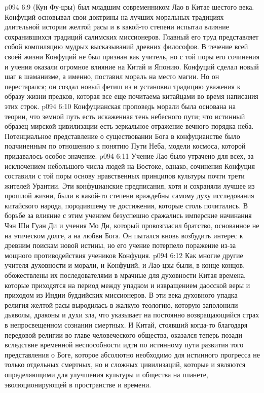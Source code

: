 \vs p094 6:9 \pc {} (Кун Фу\hyp{}цзы) был младшим современником Лао в Китае шестого века. Конфуций основывал свои доктрины на лучших моральных традициях длительной истории желтой расы и в какой\hyp{}то степени испытал влияние сохранившихся традиций салимских миссионеров. Главный его труд представляет собой компиляцию мудрых высказываний древних философов. В течение всей своей жизни Конфуций не был признан как учитель, но с той поры его сочинения и учения оказали огромное влияние на Китай и Японию. Конфуций сделал новый шаг в шаманизме, а именно, поставил мораль на место магии. Но он перестарался; он создал новый фетиш из  и установил традицию уважения к образу жизни предков, которая все еще почитаема китайцами во время написания этих строк.
\vs p094 6:10 Конфуцианская проповедь морали была основана на теории, что земной путь есть искаженная тень небесного пути; что истинный образец мирской цивилизации есть зеркальное отражение вечного порядка неба. Потенциальное представление о существовании Бога в конфуцианстве было подчиненным по отношению к понятию Пути Неба, модели космоса, которой придавалось особое значение.
\vs p094 6:11 Учение Лао было утрачено для всех, за исключением небольшого числа людей на Востоке, однако, сочинения Конфуция составили с той поры основу нравственных принципов культуры почти трети жителей Урантии. Эти конфуцианские предписания, хотя и сохраняли лучшее из прошлой жизни, были в какой\hyp{}то степени враждебны самому духу исследования китайского народа, породившему те достижения, которые столь почитались. В борьбе за влияние с этим учением безуспешно сражались имперские начинания Чэн Ши Гуан Ди и учения Мо Ди, который провозгласил братство, основанное не на этическом долге, а на любви Бога. Он пытался вновь возбудить интерес к древним поискам новой истины, но его учение потерпело поражение из\hyp{}за мощного противодействия учеников Конфуция.
\vs p094 6:12 Как многие другие учителя духовности и морали, и Конфуций, и Лао\hyp{}цзы были, в конце концов, обожествлены их последователями в мрачные для духовности Китая времена, которые приходятся на период между упадком и извращением даосской веры и приходом из Индии буддийских миссионеров. В эти века духовного упадка религия желтой расы выродилась в жалкую теологию, которую заполонили дьяволы, драконы и духи зла, что указывает на постоянно возвращающийся страх в непросвещенном сознании смертных. И Китай, стоявший когда\hyp{}то благодаря передовой религии во главе человеческого общества, оказался теперь позади вследствие временной неспособности идти по истинному пути развития того представления о Боге, которое абсолютно необходимо для истинного прогресса не только отдельных смертных, но и сложных цивилизаций, которые и являются определяющими для улучшения культуры и общества на планете, эволюционирующей в пространстве и времени.
